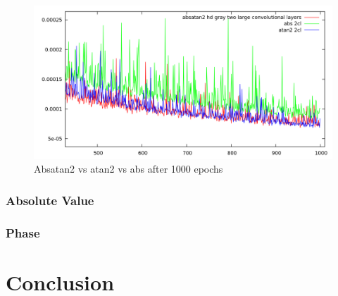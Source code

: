 \documentclass[11pt, a4paper]{article}
\begin{document}
\begin{figure}[htbp]
	\centering
	\includegraphics[width=\textwidth]{results/gabor_absatan2_vs_atan2_vs_abs.png}
	\caption{Absatan2 vs atan2 vs abs after 1000 epochs}
	\label{fig:gabor_absatan2_vs_atan2_vs_abs}
\end{figure}


\subsubsection{Absolute Value}
\subsubsection{Phase}

\newpage


\section{Conclusion}
\label{sec:conclusion}

\newpage

\end{document}
